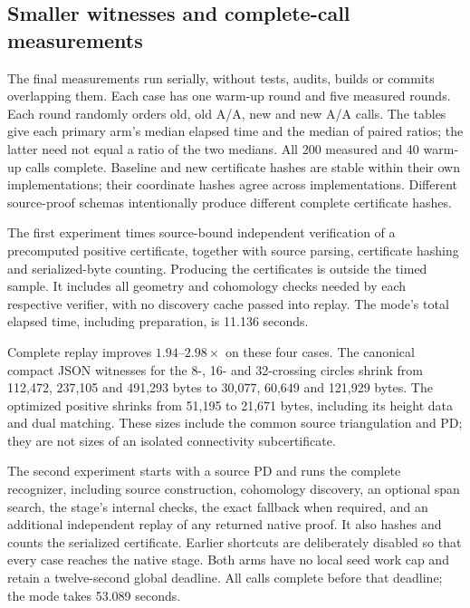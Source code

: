 \subsection{Smaller witnesses and complete-call measurements}

The final measurements run serially, without tests, audits, builds or commits
overlapping them. Each case has one warm-up round and five measured rounds.
Each round randomly orders old, old A/A, new and new A/A calls. The tables
give each primary arm's median elapsed time and the median of paired ratios;
the latter need not equal a ratio of the two medians. All 200 measured and
40 warm-up calls complete. Baseline and new certificate hashes are stable
within their own implementations; their coordinate hashes agree across
implementations. Different source-proof schemas intentionally produce
different complete certificate hashes.

The first experiment times source-bound independent verification of a
precomputed positive certificate, together with source parsing, certificate
hashing and serialized-byte counting. Producing the certificates is outside
the timed sample. It includes all geometry and cohomology checks needed by
each respective verifier, with no discovery cache passed into replay.
The mode's total elapsed time, including preparation, is 11.136 seconds.

\begin{center}
\small
\end{center}

Complete replay improves $1.94$--$2.98\times$ on these four cases. The
canonical compact JSON witnesses for the 8-, 16- and 32-crossing circles
shrink from 112,472, 237,105 and 491,293 bytes to 30,077, 60,649 and
121,929 bytes. The optimized positive shrinks from 51,195 to 21,671
bytes, including its height data and dual matching. These sizes include
the common source triangulation and PD; they are not sizes of an isolated
connectivity subcertificate.

The second experiment starts with a source PD and runs the complete
recognizer, including source construction, cohomology discovery, an optional
span search, the stage's internal checks, the exact fallback when required,
and an additional independent replay of any returned native proof. It also
hashes and counts the serialized certificate. Earlier shortcuts are
deliberately disabled so that every case reaches the native stage. Both
arms have no local seed work cap and retain a twelve-second global deadline.
All calls complete before that deadline; the mode takes 53.089 seconds.

